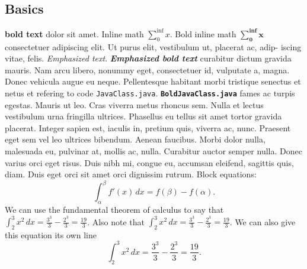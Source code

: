 \documentclass[12pt, dvipsnames, a4paper]{article}
\newcommand{\code}[1]{\texttt{#1}}
\begin{document}
\subsection{Basics}
\textbf{bold text} dolor sit amet. Inline math $\sum_{0}^{\inf} x$. Bold inline math $\mathbf{\sum_{0}^{\inf} x}$ consectetuer adipiscing elit. Ut purus elit, vestibulum ut, placerat ac, adip-
iscing vitae, felis. \emph{Emphasized text}. \textbf{\emph{Emphasized bold text}} curabitur dictum gravida mauris. Nam arcu libero, nonummy eget, consectetuer id,
vulputate a, magna. Donec vehicula augue eu neque. Pellentesque habitant morbi tristique senectus et
netus et refering to code \code{JavaClass.java}. \textbf{\code{BoldJavaClass.java}} fames ac turpis egestas. Mauris ut leo. Cras viverra metus rhoncus sem. Nulla et lectus
vestibulum urna fringilla ultrices. Phasellus eu tellus sit amet tortor gravida placerat. Integer sapien est,
iaculis in, pretium quis, viverra ac, nunc. Praesent eget sem vel leo ultrices bibendum. Aenean faucibus.
Morbi dolor nulla, malesuada eu, pulvinar at, mollis ac, nulla. Curabitur auctor semper nulla. Donec
varius orci eget risus. Duis nibh mi, congue eu, accumsan eleifend, sagittis quis, diam. Duis eget orci sit
amet orci dignissim rutrum. Block equations:
\begin{equation}
	\int_\alpha^\beta f'(x) \, dx=f(\beta)-f(\alpha).
\end{equation}
We can use the fundamental theorem of calculus to say that
$\int_2^3 x^2 \, dx=\frac{3^3}{3}-\frac{2^3}{3}=\frac{19}{3}$.
Also note that $\displaystyle \int_2^3 x^2 \, dx=\frac{3^3}{3}-\frac{2^3}{3}=\frac{19}{3}$.
We can also give this equation its own line
\[
	\int_2^3 x^2 \, dx=\frac{3^3}{3}-\frac{2^3}{3}=\frac{19}{3}.
\]
\end{document}
